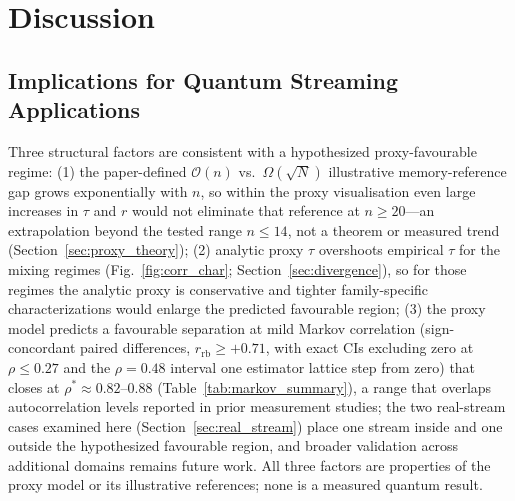 \documentclass[sensors,article,submit,pdftex,moreauthors]{Definitions/mdpi}
\newcommand{\bigO}{\mathcal{O}}
\providecommand{\DIFadd}[1]{{\protect\color{blue}#1}} %
\providecommand{\DIFdel}[1]{} %
\providecommand{\DIFaddbegin}{} %
\providecommand{\DIFaddend}{} %
\providecommand{\DIFdelbegin}{} %
\providecommand{\DIFdelend}{} %
\begin{document}
\section{Discussion}
\label{sec:discussion}

\subsection{Implications for Quantum Streaming Applications}

Three structural factors are consistent with a \DIFdelbegin \DIFdel{favourable proxy-estimated }\DIFdelend \DIFaddbegin \DIFadd{hypothesized proxy-favourable }\DIFaddend regime: (1) the \DIFaddbegin \DIFadd{paper-defined }\DIFaddend $\bigO(n)$ vs.\ $\Omega(\sqrt{N})$ \DIFdelbegin \DIFdel{worst-case }\DIFdelend \DIFaddbegin \DIFadd{illustrative }\DIFaddend memory-reference gap \DIFdelbegin \DIFdel{is independent of correlation and }\DIFdelend grows exponentially with $n$, so \DIFdelbegin \DIFdel{at $n \geq 20$ }\DIFdelend \DIFaddbegin \DIFadd{within the proxy visualisation }\DIFaddend even large increases in $\tau$ and $r$ \DIFdelbegin \DIFdel{do not eliminate the proxy-side memory-separation reference }\DIFdelend \DIFaddbegin \DIFadd{would not eliminate that reference at $n \geq 20$---an extrapolation beyond the tested range $n \leq 14$, not a theorem or measured trend (Section~\ref{sec:proxy_theory})}\DIFaddend ; (2) analytic proxy $\tau$ \DIFdelbegin \DIFdel{systematically }\DIFdelend overshoots empirical $\tau$ \DIFaddbegin \DIFadd{for the mixing regimes }\DIFaddend (Fig.~\ref{fig:corr_char}\DIFaddbegin \DIFadd{; Section~\ref{sec:divergence}}\DIFaddend ), so \DIFdelbegin \DIFdel{the proxy model }\DIFdelend \DIFaddbegin \DIFadd{for those regimes the analytic proxy }\DIFaddend is conservative and tighter family-specific characterizations would enlarge the predicted favourable region; (3) the proxy \DIFaddbegin \DIFadd{model }\DIFaddend predicts a favourable separation at \DIFdelbegin \DIFdel{$\rho \leq 0.47$ ($p \leq 0.049$) and the proxy-model crossover occurs near $\rho \approx 0.88$ ($p = 0.037$; }\DIFdelend \DIFaddbegin \DIFadd{mild Markov correlation (sign-concordant paired differences, $r_{\mathrm{rb}} \geq +0.71$, with exact CIs excluding zero at $\rho \leq 0.27$ and the $\rho = 0.48$ interval one estimator lattice step from zero) that closes at $\rho^{*} \approx 0.82$--$0.88$ (}\DIFaddend Table~\ref{tab:markov_summary}), \DIFdelbegin \DIFdel{which overlaps autocorrelation ranges }\DIFdelend \DIFaddbegin \DIFadd{a range that overlaps autocorrelation levels }\DIFaddend reported in prior measurement studies; the two real-stream cases examined here (Section~\ref{sec:real_stream}) place one stream inside and one outside the \DIFdelbegin \DIFdel{proxy-favourable }\DIFdelend \DIFaddbegin \DIFadd{hypothesized favourable }\DIFaddend region, and broader validation across additional domains remains future work. \DIFaddbegin \DIFadd{All three factors are properties of the proxy model or its illustrative references; none is a measured quantum result.
}\DIFaddend 
\end{document}
